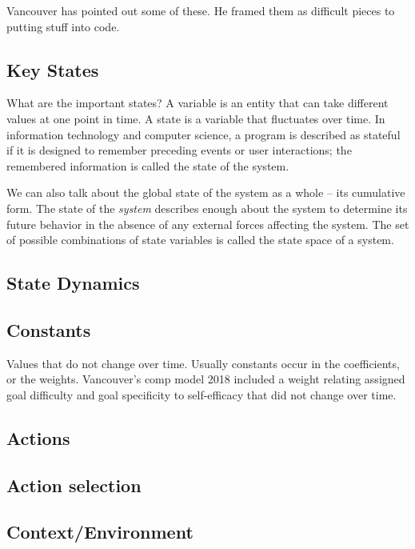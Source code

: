 \documentclass[english,,man]{apa6}
\theoremstyle{definition}
\theoremstyle{definition}
\theoremstyle{definition}
\theoremstyle{remark}
\begin{document}
Vancouver has pointed out some of these. He framed them as difficult
pieces to putting stuff into code.

\hypertarget{key-states}{%
\subsection{Key States}\label{key-states}}

What are the important states? A variable is an entity that can take
different values at one point in time. A state is a variable that
fluctuates over time. In information technology and computer science, a
program is described as stateful if it is designed to remember preceding
events or user interactions; the remembered information is called the
state of the system.

We can also talk about the global state of the system as a whole -- its
cumulative form. The state of the \emph{system} describes enough about
the system to determine its future behavior in the absence of any
external forces affecting the system. The set of possible combinations
of state variables is called the state space of a system.

\hypertarget{state-dynamics}{%
\subsection{State Dynamics}\label{state-dynamics}}

\hypertarget{constants}{%
\subsection{Constants}\label{constants}}

Values that do not change over time. Usually constants occur in the
coefficients, or the weights. Vancouver's comp model 2018 included a
weight relating assigned goal difficulty and goal specificity to
self-efficacy that did not change over time.

\hypertarget{actions}{%
\subsection{Actions}\label{actions}}

\hypertarget{action-selection}{%
\subsection{Action selection}\label{action-selection}}

\hypertarget{contextenvironment}{%
\subsection{Context/Environment}\label{contextenvironment}}
\end{document}
